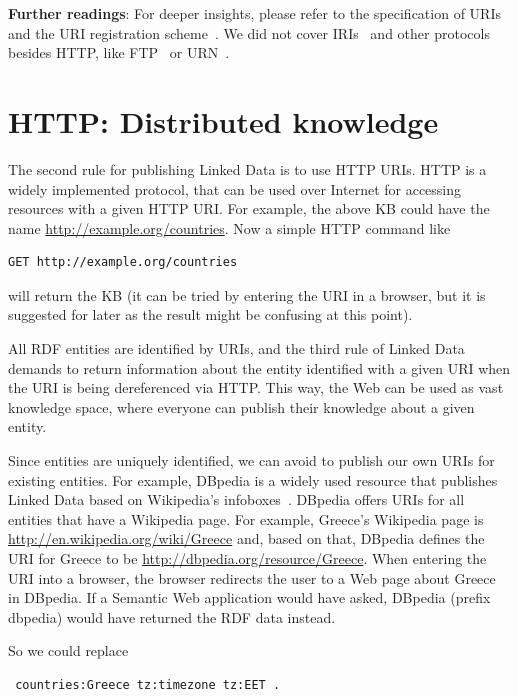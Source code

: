 \medskip

\textbf{Further readings}:
For deeper insights, please refer to the specification of URIs~\cite{uri} and the URI registration scheme~\cite{uri-registration}.
We did not cover IRIs~\cite{iri} and other protocols besides HTTP, like FTP~\cite{ftp} or URN~\cite{urn}.

\section{HTTP: Distributed knowledge}
\label{http}

The second rule for publishing Linked Data is to use HTTP URIs.
HTTP is a widely implemented protocol, that can be used over Internet for accessing resources with a given HTTP URI.
For example, the above \ac{KB} could have the name \url{http://example.org/countries}.
Now a simple HTTP command like 
\begin{verbatim}
GET http://example.org/countries
\end{verbatim}
will return the \ac{KB} (it can be tried by entering the URI in a browser, but it is suggested for later as the result might be confusing at this point).

All \ac{RDF} entities are identified by URIs, and the third rule of Linked Data demands to return information about the entity identified with a given URI when the URI is being dereferenced via HTTP.
This way, the Web can be used as vast knowledge space, where everyone can publish their knowledge about a given entity.

Since entities are uniquely identified, we can avoid to publish our own URIs for existing entities.
For example, DBpedia is a widely used resource that publishes Linked Data based on Wikipedia's infoboxes~\cite{dbpedia-swj}.
DBpedia offers URIs for all entities that have a Wikipedia page.
For example, Greece's Wikipedia page is \url{http://en.wikipedia.org/wiki/Greece} and, based on that, DBpedia defines the URI for Greece to be \url{http://dbpedia.org/resource/Greece}.
When entering the URI into a browser, the browser redirects the user to a Web page about Greece in DBpedia.
If a Semantic Web application would have asked, DBpedia (prefix dbpedia) would have returned the \ac{RDF} data instead.

So we could replace

\begin{verbatim}
 countries:Greece tz:timezone tz:EET .
\end{verbatim}


